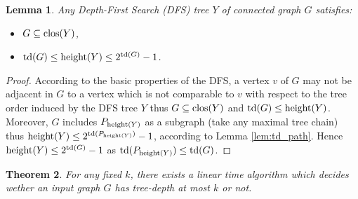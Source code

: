\documentclass[a4paper]{amsart}
\newtheorem{theorem}{Theorem}[section]
\newtheorem{lemma}[theorem]{Lemma}
\theoremstyle{definition}
\theoremstyle{remark}
\DeclareMathOperator\depth{{\rm td}}
\DeclareMathOperator\clos{{\rm clos}}
\DeclareMathOperator\height{{\rm height}}
\begin{document}
\begin{lemma}
\label{lem:DFS}
Any Depth-First Search (DFS) tree $Y$ of connected graph $G$
satisfies:
\begin{itemize}
\item $G\subseteq\clos(Y)$,
\item $\depth(G)\leq\height(Y)\leq 2^{\depth(G)}-1$.
\end{itemize}
\end{lemma}
\begin{proof}
According to the basic properties of the DFS, a vertex $v$ of $G$ may not be
adjacent in $G$ to a vertex which is not comparable to $v$ with
respect to the tree order induced by the DFS tree $Y$ thus
$G\subseteq\clos(Y)$ and $\depth(G)\leq\height(Y)$.
 Moreover, $G$ includes $P_{\height(Y)}$ as a
subgraph (take any maximal tree chain) thus $\height(Y)\leq
2^{\depth(P_{\height(Y)})}-1$, according to Lemma \ref{lem:td_path}.
Hence
$\height(Y)\leq 2^{\depth(G)}-1$ as
$\depth(P_{\height(Y)})\leq\depth(G)$.
\end{proof}
\begin{theorem}
For any fixed $k$, there exists a linear time algorithm which decides
wether an input graph $G$ has tree-depth at most $k$ or not.
\end{theorem}
\end{document}
